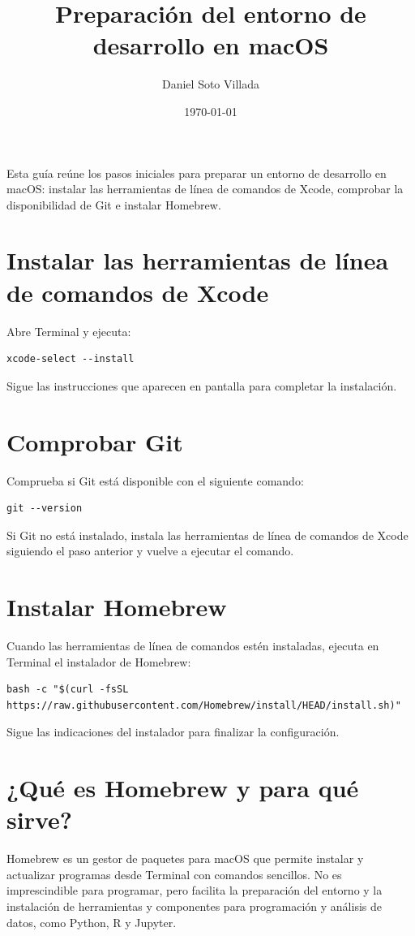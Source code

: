 \documentclass[12pt]{article}
\title{Preparación del entorno de desarrollo en macOS}
\author{Daniel Soto Villada}
\date{\today}
\begin{document}
\maketitle

Esta guía reúne los pasos iniciales para preparar un entorno de desarrollo
en macOS: instalar las herramientas de línea de comandos de Xcode, comprobar
la disponibilidad de Git e instalar Homebrew.

\section{Instalar las herramientas de línea de comandos de Xcode}

Abre Terminal y ejecuta:

\begin{lstlisting}
xcode-select --install
\end{lstlisting}

Sigue las instrucciones que aparecen en pantalla para completar la instalación.

\section{Comprobar Git}

Comprueba si Git está disponible con el siguiente comando:

\begin{lstlisting}
git --version
\end{lstlisting}

Si Git no está instalado, instala las herramientas de línea de comandos de
Xcode siguiendo el paso anterior y vuelve a ejecutar el comando.

\section{Instalar Homebrew}

Cuando las herramientas de línea de comandos estén instaladas, ejecuta en
Terminal el instalador de Homebrew:

\begin{lstlisting}
bash -c "$(curl -fsSL https://raw.githubusercontent.com/Homebrew/install/HEAD/install.sh)"
\end{lstlisting}

Sigue las indicaciones del instalador para finalizar la configuración.

\section{¿Qué es Homebrew y para qué sirve?}

Homebrew es un gestor de paquetes para macOS que permite instalar y actualizar
programas desde Terminal con comandos sencillos. No es imprescindible para
programar, pero facilita la preparación del entorno y la instalación de
herramientas y componentes para programación y análisis de datos, como Python,
R y Jupyter.
\end{document}
